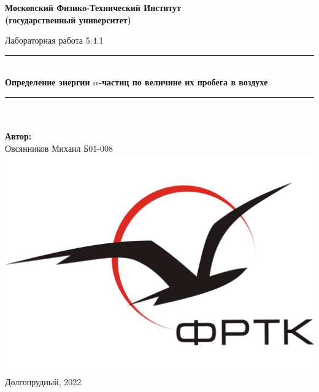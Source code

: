 \newcommand{\HRule}{\rule{\linewidth}{0.7mm}} %

\begin{center}
	\large\textbf{Московский Физико-Технический Институт}\\
	\large\textbf{(государственный университет)}
	
	\vfill
	
	
	
	\Large Лабораторная работа 5.4.1
	
	\HRule
	\\[0.4cm]
	{ \huge \bfseries Определение энергии $\alpha$-частиц по величине их пробега в воздухе}
	\\[0.4cm] %
	\HRule
	\\[0.5cm]
	
	\ \\
	\textbf{\large Автор:} \\	
	\large Овсянников Михаил Б01-008\\
	\vfill
	\hspace*{-0.8 cm}\includegraphics[width=100 pt]{./Include/frkt_logo.pdf}\\
	\large Долгопрудный, 2022
\end{center}

\thispagestyle{empty}

\newpage
\setcounter{page}{2}
\fancyfoot[c]{\thepage}
